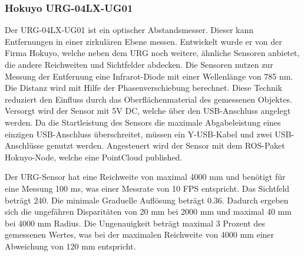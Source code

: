 \subsubsection{Hokuyo URG-04LX-UG01}
Der URG-04LX-UG01 ist ein optischer Abstandsmesser. Dieser kann Entfernungen in einer zirkulären Ebene messen. Entwickelt wurde er von der Firma Hokuyo, welche neben dem URG noch weitere, ähnliche Sensoren anbietet, die andere Reichweiten und Sichtfelder abdecken. Die Sensoren nutzen zur Messung der Entfernung eine Infrarot-Diode mit einer Wellenlänge von 785 nm. Die Distanz wird mit Hilfe der Phasenverschiebung berechnet. Diese Technik reduziert den Einfluss durch das Oberflächenmaterial des gemessenen Objektes. Versorgt wird der Sensor mit 5V DC, welche über den USB-Anschluss angelegt werden. Da die Startleistung des Sensors die maximale Abgabeleistung eines einzigen USB-Anschluss überschreitet, müssen ein Y-USB-Kabel und zwei USB-Anschlüsse genutzt werden. Angesteuert wird der Sensor mit dem ROS-Paket Hokuyo-Node, welche eine PointCloud published.

Der URG-Sensor hat eine Reichweite von maximal 4000 mm und benötigt für eine Messung 100 ms, was einer Messrate von 10 FPS entspricht. Das Sichtfeld beträgt 240\textdegree. Die minimale Graduelle Auflösung beträgt 0.36\textdegree. Dadurch ergeben sich die ungefähren Disparitäten von 20 mm bei 2000 mm und maximal 40 mm bei 4000 mm Radius. Die Ungenauigkeit beträgt maximal 3 Prozent des gemessenen Wertes, was bei der maximalen Reichweite von 4000 mm einer Abweichung von 120 mm entspricht.\cite{maeda2009}

